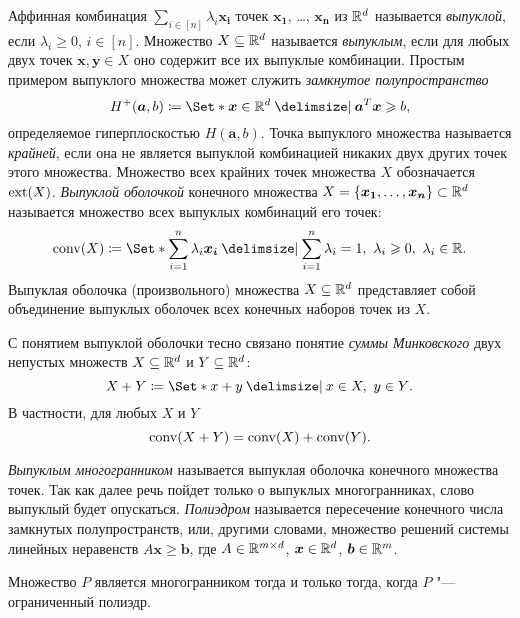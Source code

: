 Аффинная комбинация $\sum_{i\in[n]} \lambda_i \bm{x_i}$
точек $\bm{x_1}$, \dots, $\bm{x_n}$ из $\mathbb{R}^d$ называется \emph{выпуклой}, если $\lambda_i \ge 0$, $i\in[n]$.
Множество $X \subseteq \mathbb{R}^d$ называется \emph{выпуклым}, если для любых двух точек $\bm{x}, \bm{y} \in X$ 
оно содержит все их выпуклые комбинации.
Простым примером выпуклого множества может служить \emph{замкнутое полупространство} 
\[
H^+(\bm{a},b) \coloneqq \Set*{\bm{x}\in\R^d \given \bm{a}^T \bm{x} \ge b},
\]
определяемое гиперплоскостью $H(\bm{a},b)$.
Точка выпуклого множества называется \emph{крайней}, если она не является выпуклой комбинацией никаких двух других точек этого множества.
Множество всех крайних точек множества $X$ обозначается $\operatorname{ext}(X)$.
\emph{Выпуклой оболочкой} конечного множества $X = \{\bm{x_1}, \dots, \bm{x_n}\}
\subset \mathbb{R}^d$ называется множество всех выпуклых комбинаций его точек:
\[
\conv(X) \coloneqq \Set*{ \sum_{i=1}^n \lambda_i \bm{x_i} \given \sum_{i=1}^n \lambda_i = 1, \ \lambda_i \ge 0, \ \lambda_i \in \R}.
\]
Выпуклая оболочка (произвольного) множества $X \subseteq \mathbb{R}^d$ представляет собой объединение выпуклых оболочек всех конечных наборов точек из $X$. 

С понятием выпуклой оболочки тесно связано понятие \emph{суммы Минковского} двух непустых множеств $X\subseteq \mathbb{R}^d$ и $Y\subseteq \mathbb{R}^d$:
\[
X+Y \coloneqq \Set*{x+y \given x \in X, \ y\in Y}.
\]
В частности, для любых $X$ и $Y$
\[
\operatorname{conv}(X+Y) = \operatorname{conv}(X) + \operatorname{conv}(Y).
\]

\emph{Выпуклым многогранником} называется выпуклая оболочка конечного множества точек. %
Так как далее речь пойдет только о выпуклых многогранниках, слово выпуклый будет опускаться.
\emph{Полиэдром} называется пересечение конечного числа замкнутых полупространств, или, другими словами, множество решений системы линейных неравенств
\(A\bm{x} \ge \bm{b}\), где $A \in \mathbb{R}^{m\times d}$, $\bm{x}\in \mathbb{R}^d$, $\bm{b}\in \mathbb{R}^m$.

\begin{theorem}
	\sloppy
	Множество $P$ является многогранником тогда и только тогда, когда $P$ "--- ограниченный полиэдр.
\end{theorem}

